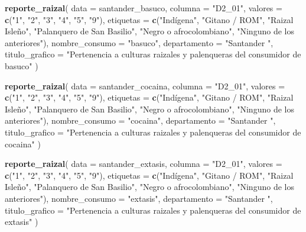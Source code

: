 \documentclass[
]{article}
\newenvironment{Shaded}{\begin{snugshade}}{\end{snugshade}}
\newcommand{\AttributeTok}[1]{\textcolor[rgb]{0.13,0.29,0.53}{#1}}
\newcommand{\FunctionTok}[1]{\textcolor[rgb]{0.13,0.29,0.53}{\textbf{#1}}}
\newcommand{\NormalTok}[1]{#1}
\newcommand{\StringTok}[1]{\textcolor[rgb]{0.31,0.60,0.02}{#1}}
\begin{document}
\begin{Shaded}
\begin{Highlighting}[]
\FunctionTok{reporte\_raizal}\NormalTok{(}
  \AttributeTok{data =}\NormalTok{ santander\_basuco,}
  \AttributeTok{columna =} \StringTok{"D2\_01"}\NormalTok{,}
  \AttributeTok{valores =} \FunctionTok{c}\NormalTok{(}\StringTok{"1"}\NormalTok{, }\StringTok{"2"}\NormalTok{, }\StringTok{"3"}\NormalTok{, }\StringTok{"4"}\NormalTok{, }\StringTok{"5"}\NormalTok{, }\StringTok{"9"}\NormalTok{),}
  \AttributeTok{etiquetas =} \FunctionTok{c}\NormalTok{(}\StringTok{"Indígena"}\NormalTok{, }\StringTok{"Gitano / ROM"}\NormalTok{, }\StringTok{"Raizal Isleño"}\NormalTok{, }\StringTok{"Palanquero de San Basilio"}\NormalTok{, }\StringTok{"Negro o afrocolombiano"}\NormalTok{, }\StringTok{"Ninguno de los anteriores"}\NormalTok{),}
  \AttributeTok{nombre\_consumo =} \StringTok{"basuco"}\NormalTok{,}
  \AttributeTok{departamento =} \StringTok{"Santander "}\NormalTok{,}
  \AttributeTok{titulo\_grafico =} \StringTok{"Pertenencia a culturas raizales y palenqueras del consumidor de basuco"}
\NormalTok{)}

\FunctionTok{reporte\_raizal}\NormalTok{(}
  \AttributeTok{data =}\NormalTok{ santander\_cocaina,}
  \AttributeTok{columna =} \StringTok{"D2\_01"}\NormalTok{,}
  \AttributeTok{valores =} \FunctionTok{c}\NormalTok{(}\StringTok{"1"}\NormalTok{, }\StringTok{"2"}\NormalTok{, }\StringTok{"3"}\NormalTok{, }\StringTok{"4"}\NormalTok{, }\StringTok{"5"}\NormalTok{, }\StringTok{"9"}\NormalTok{),}
  \AttributeTok{etiquetas =} \FunctionTok{c}\NormalTok{(}\StringTok{"Indígena"}\NormalTok{, }\StringTok{"Gitano / ROM"}\NormalTok{, }\StringTok{"Raizal Isleño"}\NormalTok{, }\StringTok{"Palanquero de San Basilio"}\NormalTok{, }\StringTok{"Negro o afrocolombiano"}\NormalTok{, }\StringTok{"Ninguno de los anteriores"}\NormalTok{),}
  \AttributeTok{nombre\_consumo =} \StringTok{"cocaina"}\NormalTok{,}
  \AttributeTok{departamento =} \StringTok{"Santander "}\NormalTok{,}
  \AttributeTok{titulo\_grafico =} \StringTok{"Pertenencia a culturas raizales y palenqueras del consumidor de cocaina"}
\NormalTok{)}

\FunctionTok{reporte\_raizal}\NormalTok{(}
  \AttributeTok{data =}\NormalTok{ santander\_extasis,}
  \AttributeTok{columna =} \StringTok{"D2\_01"}\NormalTok{,}
  \AttributeTok{valores =} \FunctionTok{c}\NormalTok{(}\StringTok{"1"}\NormalTok{, }\StringTok{"2"}\NormalTok{, }\StringTok{"3"}\NormalTok{, }\StringTok{"4"}\NormalTok{, }\StringTok{"5"}\NormalTok{, }\StringTok{"9"}\NormalTok{),}
  \AttributeTok{etiquetas =} \FunctionTok{c}\NormalTok{(}\StringTok{"Indígena"}\NormalTok{, }\StringTok{"Gitano / ROM"}\NormalTok{, }\StringTok{"Raizal Isleño"}\NormalTok{, }\StringTok{"Palanquero de San Basilio"}\NormalTok{, }\StringTok{"Negro o afrocolombiano"}\NormalTok{, }\StringTok{"Ninguno de los anteriores"}\NormalTok{),}
  \AttributeTok{nombre\_consumo =} \StringTok{"extasis"}\NormalTok{,}
  \AttributeTok{departamento =} \StringTok{"Santander "}\NormalTok{,}
  \AttributeTok{titulo\_grafico =} \StringTok{"Pertenencia a culturas raizales y palenqueras del consumidor de extasis"}
\NormalTok{)}


\end{Highlighting}
\end{Shaded}
\end{document}
